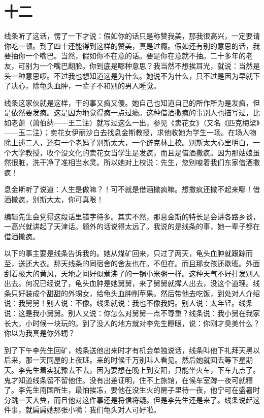 \section{十二}

线条听了这话，愣了一下才说：假如你的话只是称赞我美，那我很高兴，一定要请你吃一顿。到了四十还能得到这样的赞美，真是过瘾。假如还有别的意思的话，我要抽你一个嘴巴。当然，假如你不在意的话。要是你在意就不抽。二十多年的老友，可别为一个嘴巴翻脸。你到底是哪种意思？我当然不想挨耳光，就说：当然是头一种意思啰。不过我也想知道这是为什么。她说不为什么，只不过是因为早就下了决心，除龟头血肿，一辈子不和别的男人睡觉。 

线条这家伙就是这样，干的事又疯又傻。她自己也知道自己的所作所为是发疯，但是依然要发疯。这是因为地觉得疯一点过瘾。这种借酒撒疯的事别人也描写过，比如老萧（萧伯纳——王二注）就写过这么一出，参见《卖花女》（又名《匹克梅梁》——玉二注）；卖花女伊丽沙白去找息金斯教授，求他收她为学生一场。在场人物除上述二人，还有一个老妈子别斯太大，一个辟克林上校。别斯太大心里明白，一个大学教授，收个没文化的卖花女当学生是发疯，而且是借酒撒疯。因为那姑娘虽然很脏，洗干净了准相当水灵。所以她对上校说：先生，您别唆着我们东家借酒撒疯！ 

息金斯听了说道：人生是做嘛？！可不就是借酒撒疯嘛。想撒疯还撒不起来哪！借酒撒疯，别斯大太，你可真哏！ 


编辑先生会党得这段话里错字待多。其实不然，那息金斯的特长是会讲各路乡谈，一高兴就讲起了天津话。题外的话说得太远了。我说的是线条的事，她一辈子都在借酒撒疯。 

以下的事主要是线条告诉我的。她从煤矿回来，只过了两天，龟头血肿就跟踪而至，送还大衣。那天线条的同宿舍的舍友也在。不但在。而且那女孩还歇班。外面刮着极大的黄风，天地之间好似煮沸了的一锅小米粥一样。这种天气不好打发别人出去。何况已经说了，龟头血肿是她舅舅，来了舅舅就撵人出去，没这个道理。线条只好装成个甜甜的外甥女，给龟头血肿削苹果。然后带他去吃饭，到处对人介绍说：我舅舅！别人说：不像。线条就说：我也不像我妈。别人说：太年轻。线条说：这是我小舅舅。别人又说：你怎么对舅舅一点不尊重？线条说：我小舅在我家长大，小时候一块玩的。到了没人的地方就对李先生瞪眼，说：你刚才臭美什么？你以为我真是你外甥？ 

到了下午李先生回矿，线条送他出来时才有机会单独说话，线条叫他下礼拜天黑以后来，那一天同屋的上夜班。来的时候千万别叫人看见。然后她就回去等下星期天。李先生着实犹豫去不去，因为要想在晚上到安阳，只能坐火车，下车九点了。鬼才知道线条留不留他住。没有出差证明，住不上旅馆，在候车室蹲一夜可就糟了。李先生南国所生，最怕挨冻，要他在没生火的房子里待一夜，他宁可在盛暑时分跳一天大粪，而且他对这件事还是将信将疑。但是李先生还是来了。线条说起这件事，就扁扁她那张小嘴：我们龟头对人可好啦。 

